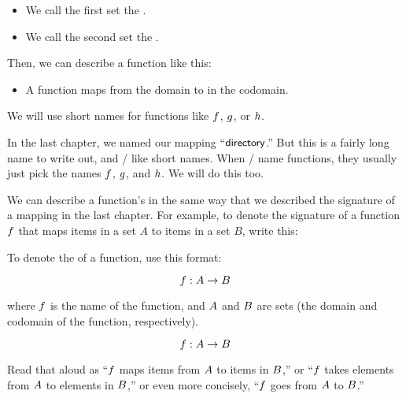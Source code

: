 \documentclass[../../../main.tex]{subfiles}
\begin{document}
\begin{itemize}
  \item We call the first set the .
  \item We call the second set the .
\end{itemize}

\noindent
Then, we can describe a function like this:

\begin{itemize}
  \item A function maps  from the domain to  in the codomain. 
\end{itemize}

\begin{terminology}
  We will use short names for functions like $f$, $g$, or $h$.
\end{terminology}

In the last chapter, we named our mapping ``$\mathsf{directory}$.'' But this is a fairly long name to write out, and \mathers/ like short names. When \mathers/ name functions, they usually just pick the names $f$, $g$, and $h$. We will do this too.

We can describe a function's  in the same way that we described the signature of a mapping in the last chapter. For example, to denote the signature of a function $f$ that maps items in a set $A$ to items in a set $B$, write this:

\begin{aside}
  \begin{notation}
    To denote the  of a function, use this format:
    
    \begin{equation*}
      f : A \rightarrow B
    \end{equation*}
    
    where $f$ is the name of the function, and $A$ and $B$ are sets (the domain and codomain of the function, respectively).
  \end{notation}
\end{aside}

\begin{equation*}
  f : A \rightarrow B
\end{equation*}

Read that aloud as ``$f$ maps items from $A$ to items in $B$,'' or ``$f$ takes elements from $A$ to elements in $B$,'' or even more concisely, ``$f$ goes from $A$ to $B$.''
\end{document}
